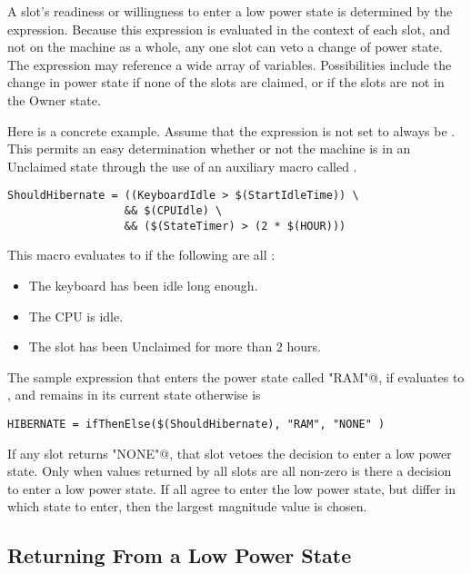 A slot's readiness or willingness to enter a low power state is 
determined by the  expression. 
Because this expression is evaluated in the context of each slot,
and not on the machine as a whole, 
any one slot can veto a change of power state.  
The  expression may reference a wide array of variables.
Possibilities include the change in power state if 
none of the slots are claimed, or if the slots are not in the
Owner state.

Here is a concrete example.
Assume that the  expression is not set to always be .
This permits an easy determination whether or not
the machine is in an Unclaimed state through the use of
an auxiliary macro called .

\footnotesize
\begin{verbatim}
ShouldHibernate = ((KeyboardIdle > $(StartIdleTime)) \
                  && $(CPUIdle) \
                  && ($(StateTimer) > (2 * $(HOUR)))
\end{verbatim}
\normalsize

This macro evaluates to  if the following are all :
\begin{itemize}
\item The keyboard has been idle long enough.
\item The CPU is idle.
\item The slot has been Unclaimed for more than 2 hours.
\end{itemize}

The sample  expression 
that enters the power state called \verb@"RAM"@, if
\MacroNI{ShouldHibernate} evaluates to ,
and remains in its current state otherwise is

\footnotesize
\begin{verbatim}
HIBERNATE = ifThenElse($(ShouldHibernate), "RAM", "NONE" )
\end{verbatim}
\normalsize

If any slot returns \verb@"NONE"@,
that slot vetoes the decision to enter a low power state.
Only when values returned by all slots are all non-zero 
is there a decision to enter a low power state.
If all agree to enter the low power state, but differ in which state to enter,
then the largest magnitude value is chosen. 


\subsection{Returning From a Low Power State}

